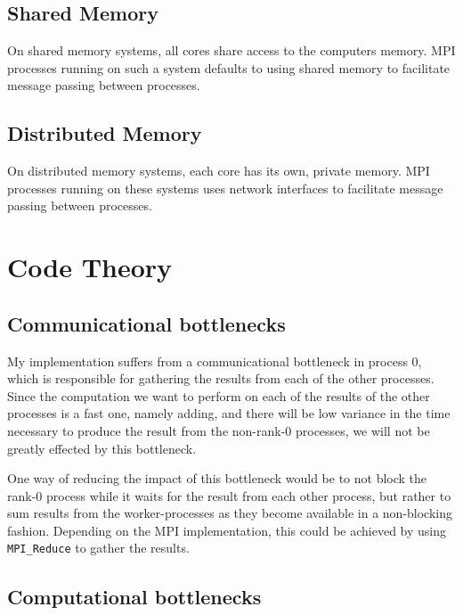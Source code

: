 \documentclass[paper=a4, fontsize=11pt]{scrartcl} %
\numberwithin{equation}{section} %
\numberwithin{figure}{section} %
\numberwithin{table}{section} %
\begin{document}
\subsection{Shared Memory}

On shared memory systems, all cores share access to the computers memory.
MPI processes running on such a system defaults to using shared memory to facilitate message passing between processes.

\subsection{Distributed Memory}

On distributed memory systems, each core has its own, private memory.
MPI processes running on these systems uses network interfaces to facilitate message passing between processes.

\section{Code Theory}

\subsection{Communicational bottlenecks}

My implementation suffers from a communicational bottleneck in process 0, which is responsible for gathering the results from each of the other processes.
Since the computation we want to perform on each of the results of the other processes is a fast one, namely adding, and there will be low variance in the time necessary to produce the result from the non-rank-0 processes, we will not be greatly effected by this bottleneck.

One way of reducing the impact of this bottleneck would be to not block the rank-0 process while it waits for the result from each other process, but rather to sum results from the worker-processes as they become available in a non-blocking fashion.
Depending on the MPI implementation, this could be achieved by using \texttt{MPI\_Reduce} to gather the results.


\subsection{Computational bottlenecks}





\end{document}
